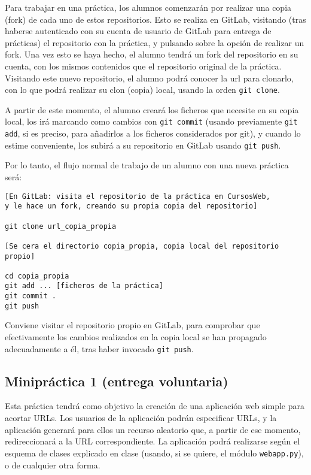 Para trabajar en una práctica, los alumnos comenzarán por realizar una copia (fork) de cada uno de estos repositorios. Esto se realiza en GitLab, visitando (tras haberse autenticado con su cuenta de usuario de GitLab para entrega de prácticas) el repositorio con la práctica, y pulsando sobre la opción de realizar un fork. Una vez esto se haya hecho, el alumno tendrá un fork del repositorio en su cuenta, con los mismos contenidos que el repositorio original de la práctica. Visitando este nuevo repositorio, el alumno podrá conocer la url para clonarlo, con lo que podrá realizar su clon (copia) local, usando la orden \verb|git clone|.

A partir de este momento, el alumno creará los ficheros que necesite en su copia local, los irá marcando como cambios con \verb|git commit| (usando previamente \verb|git add|, si es preciso, para añadirlos a los ficheros considerados por git), y cuando lo estime conveniente, los subirá a su repositorio en GitLab usando \verb|git push|.

Por lo tanto, el flujo normal de trabajo de un alumno con una nueva práctica será:

\begin{verbatim}
[En GitLab: visita el repositorio de la práctica en CursosWeb,
y le hace un fork, creando su propia copia del repositorio]

git clone url_copia_propia

[Se cera el directorio copia_propia, copia local del repositorio propio]

cd copia_propia
git add ... [ficheros de la práctica]
git commit .
git push
\end{verbatim}

Conviene visitar el repositorio propio en GitLab, para comprobar que efectivamente los cambios realizados en la copia local se han propagado adecuadamente a él, tras haber invocado \verb|git push|.

\subsection{Minipráctica 1 (entrega voluntaria)}
\label{subsec:minipractica-1-2022}

Esta práctica tendrá como objetivo la creación de una aplicación web simple para acortar URLs. Los usuarios de la aplicación podrán especificar URLs, y la aplicación generará para ellos un recurso aleatorio que, a partir de ese momento, redireccionará a la URL correspondiente. La aplicación podrá realizarse según el esquema de clases explicado en clase (usando, si se quiere, el módulo \texttt{webapp.py}), o de cualquier otra forma.

